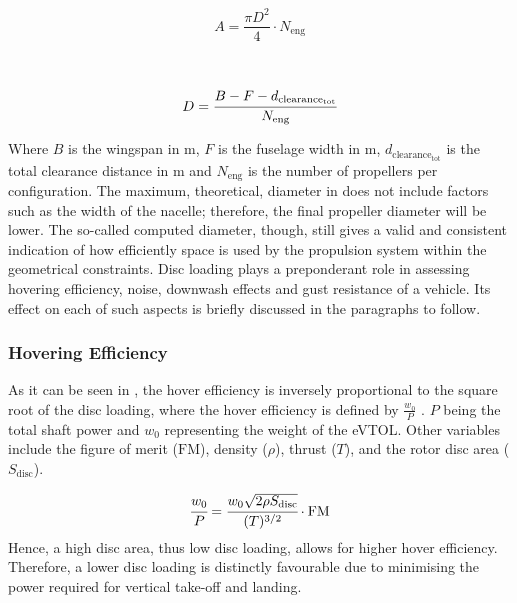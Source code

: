 \begin{minipage}{.45\linewidth}
    \begin{equation}
        \label{eq:propeller_area}
        A = \frac{\pi D^2}{4} \cdot N_{\text{eng}}
    \end{equation}
\end{minipage}
~
\begin{minipage}{.45\linewidth}
    \begin{equation}
        \label{eq:propeller_blade_diameter}
        D = \cfrac{B-F-d_{\text{clearance}_{\text{tot}}}}{N_{\text{eng}}}
    \end{equation}
\end{minipage}

Where $B$ is the wingspan in \unit{m}, $F$ is the fuselage width in \unit{m}, $d_{\text{clearance}_{\text{tot}}}$ is the total clearance distance in \unit{m} and $N_{\text{eng}}$ is the number of propellers per configuration.
The maximum, theoretical, diameter in  does not include factors such as the width of the nacelle; therefore, the final propeller diameter will be lower. The so-called computed diameter, though, still gives a valid and consistent indication of how efficiently space is used by the propulsion system within the geometrical constraints.
Disc loading plays a preponderant role in assessing hovering efficiency, noise, downwash effects and gust resistance of a vehicle.
Its effect on each of such aspects is briefly discussed in the paragraphs to follow.

\subsubsection{Hovering Efficiency}
As it can be seen in , the hover efficiency is inversely proportional to the square root of the disc loading, where the hover efficiency is defined by $\frac{w_{0}}{P}$ \cite{finger2017vtolsymposium}.
$P$ being the total shaft power and $w_{0}$ representing the weight of the eVTOL.
Other variables include the figure of merit ($\mathrm{FM}$), density ($\rho$), thrust ($T$), and the rotor disc area ($S_{\text{disc}}$).


\begin{equation}
    \label{eq:hov_eff}
    \cfrac{w_{0}}{P} = \cfrac{w_{0} \sqrt{2 \rho S_{\text{disc}}}}{(T)^{3/2}} \cdot \mathrm{FM}
\end{equation}
Hence, a high disc area, thus low disc loading, allows for higher hover efficiency.
Therefore, a lower disc loading is distinctly favourable due to minimising the power required for vertical take-off and landing.

